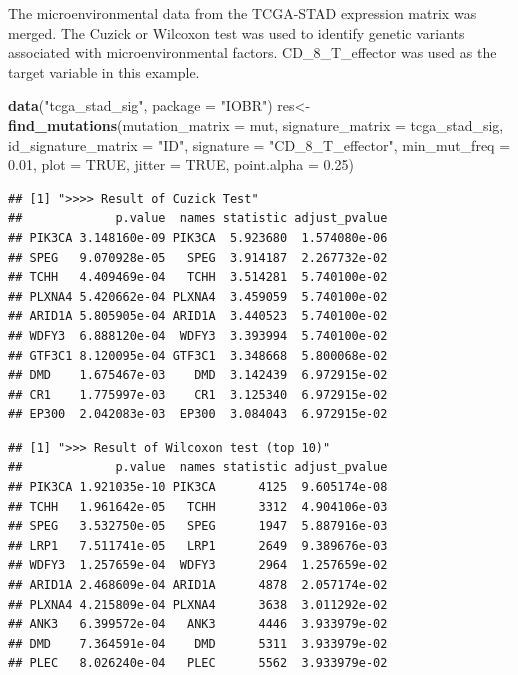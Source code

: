 \documentclass[
  12pt,
]{book}
\newenvironment{Shaded}{\begin{snugshade}}{\end{snugshade}}
\newcommand{\AttributeTok}[1]{\textcolor[rgb]{0.13,0.29,0.53}{#1}}
\newcommand{\ConstantTok}[1]{\textcolor[rgb]{0.56,0.35,0.01}{#1}}
\newcommand{\FloatTok}[1]{\textcolor[rgb]{0.00,0.00,0.81}{#1}}
\newcommand{\FunctionTok}[1]{\textcolor[rgb]{0.13,0.29,0.53}{\textbf{#1}}}
\newcommand{\NormalTok}[1]{#1}
\newcommand{\OtherTok}[1]{\textcolor[rgb]{0.56,0.35,0.01}{#1}}
\newcommand{\StringTok}[1]{\textcolor[rgb]{0.31,0.60,0.02}{#1}}
\begin{document}
The microenvironmental data from the TCGA-STAD expression matrix was merged. The Cuzick or Wilcoxon test was used to identify genetic variants associated with microenvironmental factors. CD\_8\_T\_effector was used as the target variable in this example.

\begin{Shaded}
\begin{Highlighting}[]
\FunctionTok{data}\NormalTok{(}\StringTok{"tcga\_stad\_sig"}\NormalTok{, }\AttributeTok{package =} \StringTok{"IOBR"}\NormalTok{)}
\NormalTok{res}\OtherTok{\textless{}{-}}\FunctionTok{find\_mutations}\NormalTok{(}\AttributeTok{mutation\_matrix     =}\NormalTok{ mut, }
                    \AttributeTok{signature\_matrix    =}\NormalTok{ tcga\_stad\_sig, }
                    \AttributeTok{id\_signature\_matrix =} \StringTok{"ID"}\NormalTok{, }
                    \AttributeTok{signature           =} \StringTok{"CD\_8\_T\_effector"}\NormalTok{,}
                    \AttributeTok{min\_mut\_freq        =} \FloatTok{0.01}\NormalTok{, }
                    \AttributeTok{plot                =} \ConstantTok{TRUE}\NormalTok{, }
                    \AttributeTok{jitter              =} \ConstantTok{TRUE}\NormalTok{, }
                    \AttributeTok{point.alpha         =} \FloatTok{0.25}\NormalTok{)}
\end{Highlighting}
\end{Shaded}

\begin{verbatim}
## [1] ">>>> Result of Cuzick Test"
##             p.value  names statistic adjust_pvalue
## PIK3CA 3.148160e-09 PIK3CA  5.923680  1.574080e-06
## SPEG   9.070928e-05   SPEG  3.914187  2.267732e-02
## TCHH   4.409469e-04   TCHH  3.514281  5.740100e-02
## PLXNA4 5.420662e-04 PLXNA4  3.459059  5.740100e-02
## ARID1A 5.805905e-04 ARID1A  3.440523  5.740100e-02
## WDFY3  6.888120e-04  WDFY3  3.393994  5.740100e-02
## GTF3C1 8.120095e-04 GTF3C1  3.348668  5.800068e-02
## DMD    1.675467e-03    DMD  3.142439  6.972915e-02
## CR1    1.775997e-03    CR1  3.125340  6.972915e-02
## EP300  2.042083e-03  EP300  3.084043  6.972915e-02
\end{verbatim}

\begin{verbatim}
## [1] ">>> Result of Wilcoxon test (top 10)"
##             p.value  names statistic adjust_pvalue
## PIK3CA 1.921035e-10 PIK3CA      4125  9.605174e-08
## TCHH   1.961642e-05   TCHH      3312  4.904106e-03
## SPEG   3.532750e-05   SPEG      1947  5.887916e-03
## LRP1   7.511741e-05   LRP1      2649  9.389676e-03
## WDFY3  1.257659e-04  WDFY3      2964  1.257659e-02
## ARID1A 2.468609e-04 ARID1A      4878  2.057174e-02
## PLXNA4 4.215809e-04 PLXNA4      3638  3.011292e-02
## ANK3   6.399572e-04   ANK3      4446  3.933979e-02
## DMD    7.364591e-04    DMD      5311  3.933979e-02
## PLEC   8.026240e-04   PLEC      5562  3.933979e-02
\end{verbatim}
\end{document}
